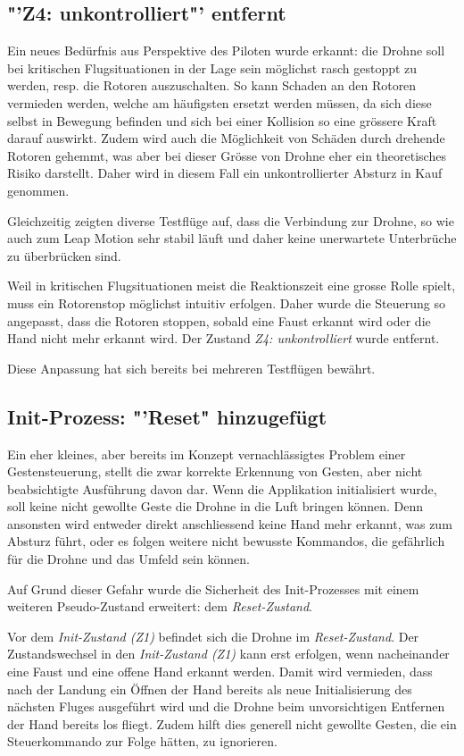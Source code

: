 \subsection{"'Z4: unkontrolliert"' entfernt}
Ein neues Bedürfnis aus Perspektive des Piloten wurde erkannt: die Drohne soll bei kritischen Flugsituationen in der Lage sein möglichst rasch gestoppt zu werden, resp. die Rotoren auszuschalten.
So kann Schaden an den Rotoren vermieden werden, welche am häufigsten ersetzt werden müssen, da sich diese selbst in Bewegung befinden und sich bei einer Kollision so eine grössere Kraft darauf auswirkt.
Zudem wird auch die Möglichkeit von Schäden durch drehende Rotoren gehemmt, was aber bei dieser Grösse von Drohne eher ein theoretisches Risiko darstellt.
Daher wird in diesem Fall ein unkontrollierter Absturz in Kauf genommen.

Gleichzeitig zeigten diverse Testflüge auf, dass die Verbindung zur Drohne, so wie auch zum Leap Motion sehr stabil läuft und daher keine unerwartete Unterbrüche zu überbrücken sind.

Weil in kritischen Flugsituationen meist die Reaktionszeit eine grosse Rolle spielt, muss ein Rotorenstop möglichst intuitiv erfolgen.
Daher wurde die Steuerung so angepasst, dass die Rotoren stoppen, sobald eine Faust erkannt wird oder die Hand nicht mehr erkannt wird.
Der Zustand \textit{Z4: unkontrolliert} wurde entfernt.

Diese Anpassung hat sich bereits bei mehreren Testflügen bewährt.

\subsection{Init-Prozess: "'Reset" hinzugefügt}
Ein eher kleines, aber bereits im Konzept vernachlässigtes Problem einer Gestensteuerung, stellt die zwar korrekte Erkennung von Gesten, aber nicht beabsichtigte Ausführung davon dar.
Wenn die Applikation initialisiert wurde, soll keine nicht gewollte  Geste die Drohne in die Luft bringen können.
Denn ansonsten wird entweder direkt anschliessend keine Hand mehr erkannt, was zum Absturz führt, oder es folgen weitere nicht bewusste Kommandos, die gefährlich für die Drohne und das Umfeld sein können.

Auf Grund dieser Gefahr wurde die Sicherheit des Init-Prozesses mit einem weiteren Pseudo-Zustand erweitert: dem \textit{Reset-Zustand}.

Vor dem \textit{Init-Zustand (Z1)} befindet sich die Drohne im \textit{Reset-Zustand}. Der Zustandswechsel in den \textit{Init-Zustand (Z1)} kann erst erfolgen, wenn nacheinander eine Faust und eine offene Hand erkannt werden.
Damit wird vermieden, dass nach der Landung ein Öffnen der Hand bereits als neue Initialisierung des nächsten Fluges ausgeführt wird und die Drohne beim unvorsichtigen Entfernen der Hand bereits los fliegt.
Zudem hilft dies generell nicht gewollte Gesten, die ein Steuerkommando zur Folge hätten, zu ignorieren.

